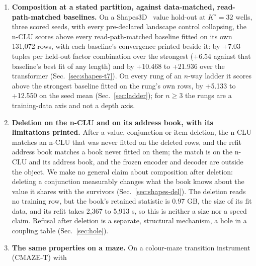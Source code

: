 \documentclass{article} %
\newcommand{\Kstar}{\ensuremath{K^{\star}}}
\begin{document}
\begin{enumerate}
\item \textbf{Composition at a stated partition, against data-matched, read-path-matched baselines.} On a
  Shapes3D~\citep{3dshapes18,kim_disentangling_2019} value hold-out at $\Kstar=32$ wells, three scored seeds, with every %
  pre-declared landscape control collapsing, the n-CLU scores above every read-path-matched baseline
  fitted on its own 131,072 rows, with each baseline's convergence printed beside it: by +7.03 tuples %
  per held-out factor combination over the strongest (+6.54 against that baseline's best fit of any length) and by +10.468 %
  to +21.936 over the transformer (Sec.~\ref{sec:shapes-t7}). On every rung of an $n$-way ladder it %
  scores above the strongest baseline fitted on the rung's own rows, by +5.133 to +12.550 on the seed %
  mean (Sec.~\ref{sec:ladder}); for $n\ge3$ the rungs are a training-data axis and not a depth axis.
\item \textbf{Deletion on the n-CLU and on its address book, with its limitations printed.} After
  a value, conjunction or item deletion, the n-CLU matches an n-CLU that was never fitted on the deleted
  rows, and the refit address book matches a book never fitted on them; the match is on the n-CLU and
  its address book, and the frozen encoder and decoder are outside the object. We make no general claim
  about composition after deletion: deleting a conjunction measurably changes what the book knows %
  about the value it shares with the survivors (Sec.~\ref{sec:shapes-del}). The deletion reads no
  training row, but the book's retained statistic is 0.97 GB, the size of its fit data, and its refit %
  takes 2,367 to 5,913 s, so this is neither a size nor a speed claim. Refusal after deletion is a %
  separate, structural mechanism, a hole in a coupling table (Sec.~\ref{sec:hole}).
\item \textbf{The same properties on a maze.} On a colour-maze transition instrument (CMAZE-T) with

\end{enumerate}
\end{document}
